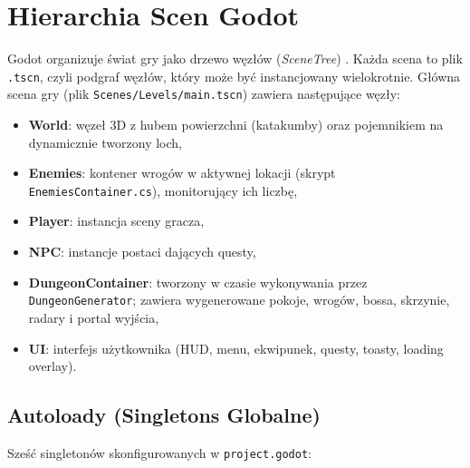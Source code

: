 \section{Hierarchia Scen Godot}

Godot organizuje świat gry jako drzewo węzłów (\textit{SceneTree}) \cite{godot4docs}. Każda scena to plik \texttt{.tscn}, czyli podgraf węzłów, który może być instancjowany wielokrotnie. Główna scena gry (plik \texttt{Scenes/\allowbreak Levels/\allowbreak main.tscn}) zawiera następujące węzły:

\begin{itemize}
    \item \textbf{World}: węzeł 3D z hubem powierzchni (katakumby) oraz pojemnikiem na dynamicznie tworzony loch,
    \item \textbf{Enemies}: kontener wrogów w aktywnej lokacji (skrypt \texttt{EnemiesContainer.cs}), monitorujący ich liczbę,
    \item \textbf{Player}: instancja sceny gracza,
    \item \textbf{NPC}: instancje postaci dających questy,
    \item \textbf{DungeonContainer}: tworzony w czasie wykonywania przez \texttt{DungeonGenerator}; zawiera wygenerowane pokoje, wrogów, bossa, skrzynie, radary i portal wyjścia,
    \item \textbf{UI}: interfejs użytkownika (HUD, menu, ekwipunek, questy, toasty, loading overlay).
\end{itemize}

\subsection{Autoloady (Singletons Globalne)}

Sześć singletonów skonfigurowanych w \texttt{project.godot}:

